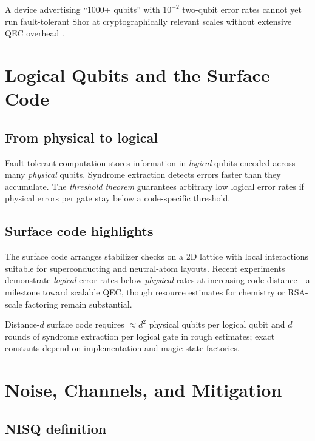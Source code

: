\begin{example}
A device advertising ``1000+ qubits'' with $10^{-2}$ two-qubit error rates cannot yet run fault-tolerant Shor at cryptographically relevant scales without extensive QEC overhead \cite{preskill2018}.
\end{example}

\section{Logical Qubits and the Surface Code}
\label{sec:surface-code}

\subsection{From physical to logical}

Fault-tolerant computation stores information in \emph{logical} qubits encoded across many \emph{physical} qubits. Syndrome extraction detects errors faster than they accumulate. The \emph{threshold theorem} guarantees arbitrary low logical error rates if physical errors per gate stay below a code-specific threshold.

\subsection{Surface code highlights}

The surface code \cite{acharya2024} arranges stabilizer checks on a 2D lattice with local interactions suitable for superconducting and neutral-atom layouts. Recent experiments demonstrate \emph{logical} error rates below \emph{physical} rates at increasing code distance---a milestone toward scalable QEC, though resource estimates for chemistry or RSA-scale factoring remain substantial.

\begin{example}
Distance-$d$ surface code requires $\approx d^2$ physical qubits per logical qubit and $d$ rounds of syndrome extraction per logical gate in rough estimates; exact constants depend on implementation and magic-state factories.
\end{example}

\section{Noise, Channels, and Mitigation}
\label{sec:nisq}

\subsection{NISQ definition}

